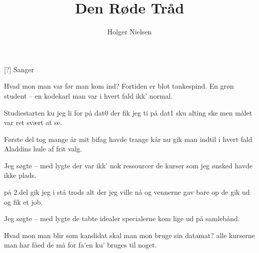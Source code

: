 \documentclass[a4paper,11pt]{article}
\title{Den Røde Tråd}
\author{Holger Nielsen}
\begin{document}
\maketitle

\begin{roles}
[?] Sanger
\end{roles}

\begin{song}

Hvad mon man var før man kom ind? 
Fortiden er blot tankespind.	
En grøn student -- en kodekarl	
man var i hvert fald ikk' normal.

Studiestarten ku jeg li		
for på dat0 der fik jeg ti	
på dat1 sku alting ske		
men målet var ret  svært at se.

Første del tog mange år	
mit bifag havde trange kår	
nu gik man indtil i hvert fald	
Aladdins hule af frit valg.	

Jeg søgte -- med lygte		
der var ikk' nok ressourcer	
de kurser som jeg ønsked havde ikke plads.

på 2.del gik jeg i stå	
trods alt der jeg ville nå	
og vennerne gav bare op		
de gik ud og fik et job.	

Jeg søgte -- med lygte 	
de tabte idealer		
specialerne kom lige ud på samlebånd.

Hvad mon man blir som kandidat	
skal man mon bruge sin datamat?	
alle kurserne man har fåed	
de må for fa'en ku' bruges til noget.

\end{song}
\end{document}
